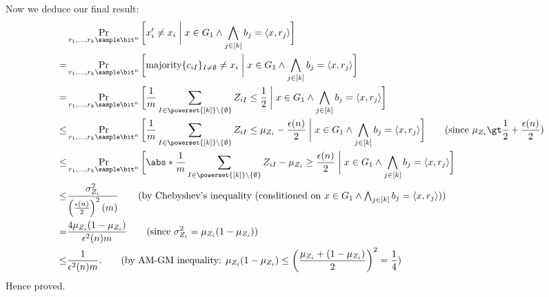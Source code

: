 \begin{answer}[iii]
    Now we deduce our final result:
    \begin{align*}
        &\Pr_{r_1,\ldots,r_k\sample\bit^n}\bigg[ x_i'\neq x_i \biggm\vert x\in G_1 \land \bigwedge_{j\in[k]} b_j = \langle x,r_j \rangle \biggr]\\
        =&  \Pr_{r_1,\ldots,r_k\sample\bit^n}\bigg[ \textrm{majority}\{c_{iI}\}_{I\neq \emptyset}\neq x_i \biggm\vert x\in G_1 \land \bigwedge_{j\in[k]} b_j = \langle x,r_j \rangle \biggr]\\
        =&  \Pr_{r_1,\ldots,r_k\sample\bit^n}\bigg[ \frac{1}{m}\sum_{I\in \powerset{[k]}\setminus \{\emptyset\}} Z_{iI}\le \frac{1}{2} \biggm\vert x\in G_1 \land \bigwedge_{j\in[k]} b_j = \langle x,r_j \rangle \biggr]\\
        \le&  \Pr_{r_1,\ldots,r_k\sample\bit^n}\bigg[ \frac{1}{m}\sum_{I\in \powerset{[k]}\setminus \{\emptyset\}} Z_{iI}\le \mu_{Z_i}-\frac{\epsilon(n)}{2} \biggm\vert x\in G_1 \land \bigwedge_{j\in[k]} b_j = \langle x,r_j \rangle \biggr]
        \qquad (\textrm{since } \mu_{Z_i}\gt \frac{1}{2}+\frac{\epsilon(n)}{2})\\
        \le&  \Pr_{r_1,\ldots,r_k\sample\bit^n}\bigg[ \abs*{\frac{1}{m}\sum_{I\in \powerset{[k]}\setminus \{\emptyset\}} Z_{iI} - \mu_{Z_i} }\ge \frac{\epsilon(n)}{2} \biggm\vert x\in G_1 \land \bigwedge_{j\in[k]} b_j = \langle x,r_j \rangle \biggr] \\
        \le&  \frac{\sigma_{Z_i}^2}{\left(\frac{\epsilon(n)}{2}\right)^2 (m)}
        \qquad (\textrm{by Chebyshev's inequality (conditioned on $\textstyle x\in G_1 \land \bigwedge_{j\in[k]} b_j = \langle x,r_j \rangle$)})\\
        =& \frac{4 \mu_{Z_i} (1-\mu_{Z_i})}{\epsilon^2(n) m}
        \qquad (\textrm{since $\sigma_{Z_i}^2=\mu_{Z_i} (1-\mu_{Z_i})$})\\
        \le& \frac{1}{\epsilon^2(n) m}.
        \qquad (\textrm{by AM-GM inequality: $\mu_{Z_i} (1-\mu_{Z_i})\le \left(\frac{\mu_{Z_i} +(1-\mu_{Z_i})}{2}\right)^2=\frac{1}{4} $})
    \end{align*}
    Hence proved.
\end{answer}